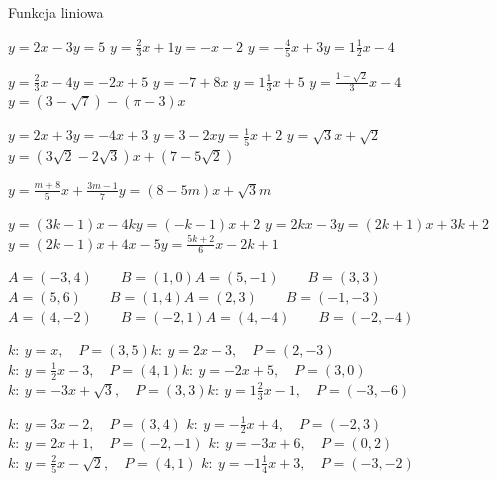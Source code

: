 \documentclass[12pt,a4paper]{article}
\begin{document}
	
	\begin{center}
		\LARGE Funkcja liniowa
	\end{center}
	
	{$y=2x-3$}{$y=5$}
	{$y=\frac{2}{3}x+1$}{$y=-x-2$}
	{$y=-\frac{4}{5}x+3$}{$y=1\frac{1}{2}x-4$}
	
	{$y=\frac{2}{3}x-4$}{$y=-2x+5$}
	{$y=-7+8x$}	{$y=1\frac{1}{3}x+5$}
	{$y=\frac{1-\sqrt{2}}{3}x-4$}{$y=(3-\sqrt{7})-(\pi -3)x$}
	
	{$y=2x+3$}{$y=-4x+3$}
	{$y=3-2x$}{$y=\frac{1}{5}x+2$}
	{$y=\sqrt{3}x+\sqrt{2}$}{$y=(3\sqrt{2}-2\sqrt{3})x+(7-5\sqrt{2})$}
	
	{$y=\frac{m+8}{5}x+\frac{3m-1}{7}$}{$y=(8-5m)x+\sqrt{3}m$}
	
	{$y=(3k-1)x-4k$}{$y=(-k-1)x+2$}
	{$y=2kx-3$}{$y=(2k+1)x+3k+2$}
	{$y=(2k-1)x+4x-5$}{$y=\frac{5k+2}{6}x-2k+1$}
	
	{$A=(-3,4)\qquad B=(1,0)$}{$A=(5,-1)\qquad B=(3,3)$}
	{$A=(5,6)\qquad B=(1,4)$}{$A=(2,3)\qquad B=(-1,-3)$}
	{$A=(4,-2)\qquad B=(-2,1)$}{$A=(4,-4)\qquad B=(-2,-4)$}
	
	{$k: \: y=x, \quad P=(3,5)$}{$k: \: y=2x-3, \quad P=(2,-3)$}
	{$k: \: y=\frac{1}{2}x-3, \quad P=(4,1)$}{$k: \: y=-2x+5, \quad P=(3,0)$}
	{$k: \: y=-3x+\sqrt{3}, \quad P=(3,3)$}{$k: \: y=1\frac{2}{3}x-1, \quad P=(-3,-6)$}
	
	\newpage
	
	{$k: \: y=3x-2, \quad P=(3,4)$}
	{$k: \: y=-\frac{1}{2}x+4, \quad P=(-2,3)$}
	{$k: \: y=2x+1, \quad P=(-2,-1)$}
	{$k: \: y=-3x+6, \quad P=(0,2)$}
	{$k: \: y=\frac{2}{5}x-\sqrt{2}, \quad P=(4,1)$}
	{$k: \: y=-1\frac{1}{4}x+3, \quad P=(-3,-2)$}
	
	
	
\end{document}
